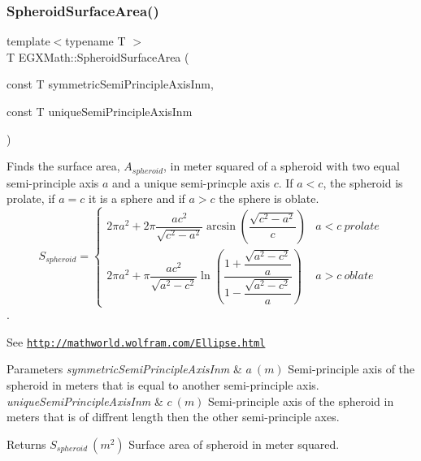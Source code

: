 \subsubsection{\texorpdfstring{Spheroid\+Surface\+Area()}{SpheroidSurfaceArea()}}
{\footnotesize\ttfamily template$<$typename T $>$ \\
T E\+G\+X\+Math\+::\+Spheroid\+Surface\+Area (\begin{DoxyParamCaption}\item[{const T}]{symmetric\+Semi\+Principle\+Axis\+Inm,  }\item[{const T}]{unique\+Semi\+Principle\+Axis\+Inm }\end{DoxyParamCaption})}



Finds the surface area, $A_{spheroid}$, in meter squared of a spheroid with two equal semi-\/principle axis $a$ and a unique semi-\/princple axis $c$. If $a < c$, the spheroid is prolate, if $a = c$ it is a sphere and if $a>c$ the sphere is oblate. \[ S_{spheroid}=\begin{cases} 2\pi a^2 + 2\pi\dfrac{a c^2}{\sqrt{c^2-a^2}}\arcsin \left ( \dfrac{\sqrt{c^2-a^2}}{c} \right ) & a<c\ prolate \\ 2\pi a^2 +\pi \dfrac{a c^2}{\sqrt{a^2-c^2}}\ln \left(\dfrac{1+\dfrac{\sqrt{a^2-c^2}}{a}}{1-\dfrac{\sqrt{a^2-c^2}}{a}}\right )& a>c\ oblate \end{cases} \]. 

See \href{http://mathworld.wolfram.com/Ellipse.html}{\tt http\+://mathworld.\+wolfram.\+com/\+Ellipse.\+html}


\begin{DoxyParams}{Parameters}
{\em symmetric\+Semi\+Principle\+Axis\+Inm} & $ a\ (m)$ Semi-\/principle axis of the spheroid in meters that is equal to another semi-\/principle axis. \\
\hline
{\em unique\+Semi\+Principle\+Axis\+Inm} & $ c\ (m)$ Semi-\/principle axis of the spheroid in meters that is of diffrent length then the other semi-\/principle axes. \\
\hline
\end{DoxyParams}
\begin{DoxyReturn}{Returns}
$ S_{spheroid}\ (m^2)$ Surface area of spheroid in meter squared. 
\end{DoxyReturn}
